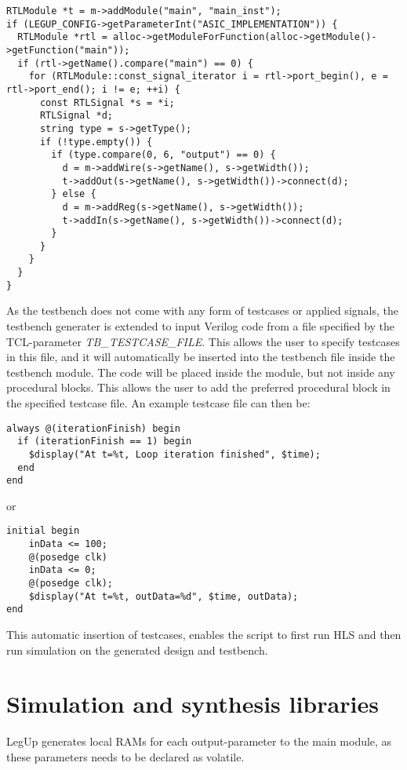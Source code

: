 \begin{lstlisting}
RTLModule *t = m->addModule("main", "main_inst");
if (LEGUP_CONFIG->getParameterInt("ASIC_IMPLEMENTATION")) {
  RTLModule *rtl = alloc->getModuleForFunction(alloc->getModule()->getFunction("main"));
  if (rtl->getName().compare("main") == 0) {
    for (RTLModule::const_signal_iterator i = rtl->port_begin(), e = rtl->port_end(); i != e; ++i) {
      const RTLSignal *s = *i;
      RTLSignal *d;
      string type = s->getType();
      if (!type.empty()) {
        if (type.compare(0, 6, "output") == 0) {
          d = m->addWire(s->getName(), s->getWidth());
          t->addOut(s->getName(), s->getWidth())->connect(d);
        } else {
          d = m->addReg(s->getName(), s->getWidth());
          t->addIn(s->getName(), s->getWidth())->connect(d);
        }
      }
    }
  }
}
\end{lstlisting}

As the testbench does not come with any form of testcases or applied signals, the testbench generater is extended to input Verilog code from a file specified by the TCL-parameter \textit{TB\_TESTCASE\_FILE}. This allows the user to specify testcases in this file, and it will automatically be inserted into the testbench file inside the testbench module. The code will be placed inside the module, but not inside any procedural blocks. This allows the user to add the preferred procedural block in the specified testcase file. An example testcase file can then be:

\lstset{language=Verilog, style=Verilogstyle}
\begin{lstlisting}
always @(iterationFinish) begin
  if (iterationFinish == 1) begin
    $display("At t=%t, Loop iteration finished", $time);
  end
end
\end{lstlisting}
or
\begin{lstlisting}
initial begin
    inData <= 100;
    @(posedge clk)
    inData <= 0;
    @(posedge clk);
    $display("At t=%t, outData=%d", $time, outData);
end
\end{lstlisting}
This automatic insertion of testcases, enables the script to first run HLS and then run simulation on the generated design and testbench.

\section{Simulation and synthesis libraries}

LegUp generates local RAMs for each output-parameter to the main module, as these parameters needs to be declared as volatile. 

